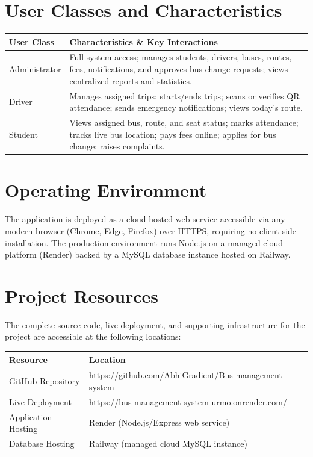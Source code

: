 \documentclass[11pt,a4paper]{report}
\begin{document}
\section{User Classes and Characteristics}
\begin{longtable}{@{}p{2.6cm}p{11cm}@{}}
\toprule
\rowcolor{pine!10}\textbf{User Class} & \textbf{Characteristics \& Key Interactions} \\
\midrule
\endhead
Administrator & Full system access; manages students, drivers, buses, routes, fees, notifications, and approves bus change requests; views centralized reports and statistics. \\
Driver & Manages assigned trips; starts/ends trips; scans or verifies QR attendance; sends emergency notifications; views today's route. \\
Student & Views assigned bus, route, and seat status; marks attendance; tracks live bus location; pays fees online; applies for bus change; raises complaints. \\
\bottomrule
\end{longtable}

\section{Operating Environment}
The application is deployed as a cloud-hosted web service accessible via any modern browser (Chrome, Edge, Firefox) over HTTPS, requiring no client-side installation. The production environment runs Node.js on a managed cloud platform (Render) backed by a MySQL database instance hosted on Railway.

\section{Project Resources}
The complete source code, live deployment, and supporting infrastructure for the project are accessible at the following locations:

\begin{longtable}{@{}p{3.4cm}p{10.7cm}@{}}
\toprule
\rowcolor{pine!10}\textbf{Resource} & \textbf{Location} \\
\midrule
\endhead
GitHub Repository & \url{https://github.com/AbhiGradient/Bus-management-system} \\
Live Deployment & \url{https://bus-management-system-urmo.onrender.com/} \\
Application Hosting & Render (Node.js/Express web service) \\
Database Hosting & Railway (managed cloud MySQL instance) \\
\bottomrule
\end{longtable}
\end{document}
